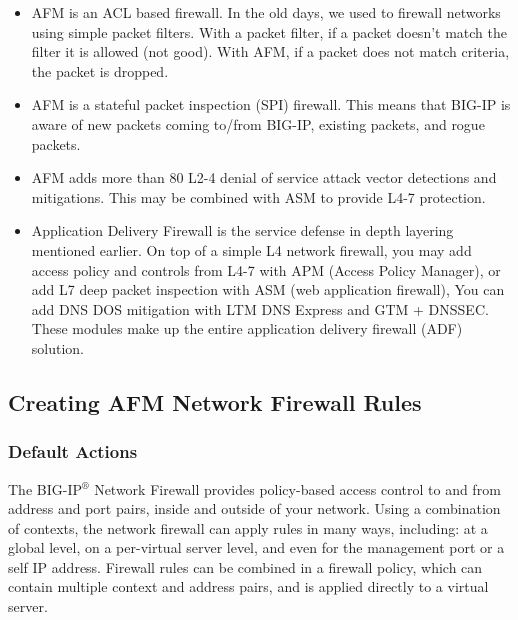 \documentclass[letterpaper,10pt,english]{sphinxmanual}
\begin{document}
\begin{itemize}
\item {} 
AFM is an ACL based firewall. In the old days, we used to firewall
networks using simple packet filters. With a packet filter, if a
packet doesn’t match the filter it is allowed (not good). With AFM,
if a packet does not match criteria, the packet is dropped.

\item {} 
AFM is a stateful packet inspection (SPI) firewall. This means that
BIG-IP is aware of new packets coming to/from BIG-IP, existing
packets, and rogue packets.

\item {} 
AFM adds more than 80 L2-4 denial of service attack vector detections
and mitigations. This may be combined with ASM to provide L4-7
protection.

\item {} 
Application Delivery Firewall is the service defense in depth
layering mentioned earlier. On top of a simple L4 network firewall,
you may add access policy and controls from L4-7 with APM (Access
Policy Manager), or add L7 deep packet inspection with ASM (web
application firewall), You can add DNS DOS mitigation with LTM DNS
Express and GTM + DNSSEC. These modules make up the entire
application delivery firewall (ADF) solution.

\end{itemize}


\subsection{Creating AFM Network Firewall Rules}
\label{\detokenize{class1/module1/lab3::doc}}\label{\detokenize{class1/module1/lab3:creating-afm-network-firewall-rules}}

\subsubsection{Default Actions}
\label{\detokenize{class1/module1/lab3:default-actions}}
The BIG-IP$^{\text{®}}$ Network Firewall provides policy-based access
control to and from address and port pairs, inside and outside of your
network. Using a combination of contexts, the network firewall can apply
rules in many ways, including: at a global level, on a per-virtual
server level, and even for the management port or a self IP address.
Firewall rules can be combined in a firewall policy, which can contain
multiple context and address pairs, and is applied directly to a virtual
server.
\end{document}
